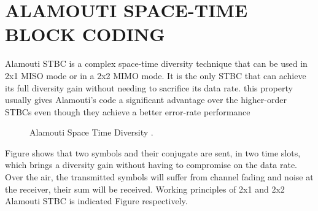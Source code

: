 \documentclass[12pt]{report}
\begin{document}
    \section*{ ALAMOUTI SPACE-TIME BLOCK CODING}
    Alamouti STBC is a complex space-time diversity
technique that can be used in 2x1 MISO mode or in a 2x2
MIMO mode. It is the only STBC that can achieve its full
diversity gain without needing to sacrifice its data rate.
this property usually gives Alamouti's code a significant
advantage over the higher-order STBCs even though they
achieve a better error-rate performance

\begin{figure}[!hbt]
		\begin{center}
		\caption{ Alamouti Space Time Diversity .}
		\label{fig:tf_plot}
		\end{center}
	\end{figure}
Figure shows that two symbols and their conjugate are
sent, in two time slots, which brings a diversity gain
without having to compromise on the data rate. Over the
air, the transmitted symbols will suffer from channel
fading and noise at the receiver, their sum will be
received. Working principles of 2x1 and 2x2 Alamouti
STBC is indicated Figure respectively.
\end{document}
